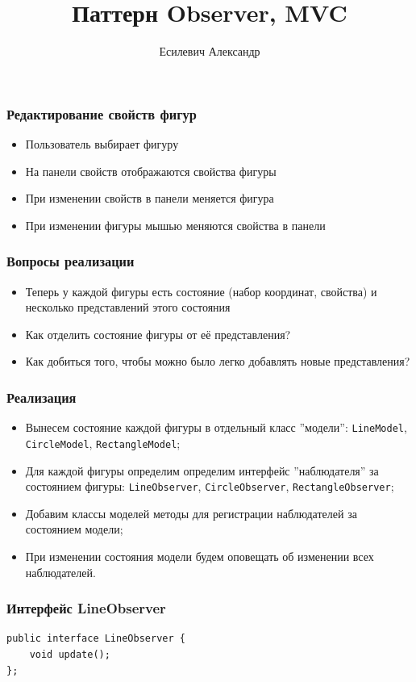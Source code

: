 \documentclass[handout]{beamer}
\title{Паттерн Observer, MVC}
\author{Есилевич Александр}
\begin{document}
\maketitle


\begin{frame}[fragile]
\frametitle{Редактирование свойств фигур}
\begin{itemize}
\item Пользователь выбирает фигуру
\item На панели свойств отображаются свойства фигуры
\item При изменении свойств в панели меняется фигура
\item При изменении фигуры мышью меняются свойства в панели
\end{itemize}
\end{frame}


\begin{frame}[fragile]
\frametitle{Вопросы реализации}
\begin{itemize}
\item Теперь у каждой фигуры есть состояние (набор координат, свойства)
      и несколько представлений этого состояния
\item Как отделить состояние фигуры от её представления?
\item Как добиться того, чтобы можно было легко добавлять новые представления?
\end{itemize}
\end{frame}


\begin{frame}[fragile]
\frametitle{Реализация}
\begin{itemize}
\item Вынесем состояние каждой фигуры в отдельный класс ''модели'': \lstinline{LineModel},
      \lstinline{CircleModel}, \lstinline{RectangleModel};
\item Для каждой фигуры определим определим интерфейс ''наблюдателя'' за состоянием
      фигуры: \lstinline{LineObserver}, \lstinline{CircleObserver}, \lstinline{RectangleObserver};
\item Добавим классы моделей методы для регистрации наблюдателей за состоянием модели;
\item При изменении состояния модели будем оповещать об изменении всех наблюдателей.
\end{itemize}
\end{frame}


\begin{frame}[fragile]
\frametitle{Интерфейс LineObserver}
\begin{lstlisting}
public interface LineObserver {
    void update();
};
\end{lstlisting}
\end{frame}
\end{document}
